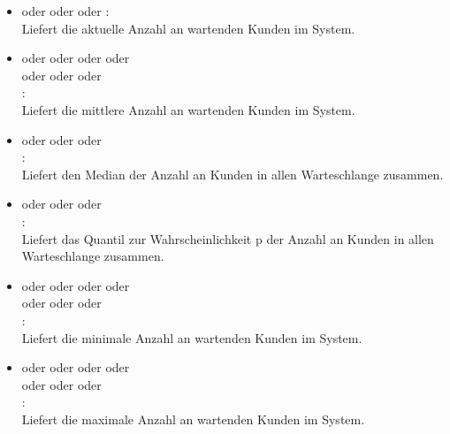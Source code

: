 \begin{itemize}    

\item
{} oder  oder  oder :\\
Liefert die aktuelle Anzahl an wartenden Kunden im System.

\item
{} oder  oder  oder  oder\\
 oder  oder  oder\\
:\\
Liefert die mittlere Anzahl an wartenden Kunden im System.

\item
{} oder  oder  oder\\
:\\
Liefert den Median der Anzahl an Kunden in allen Warteschlange zusammen.

\item
{} oder  oder  oder\\
:\\
Liefert das Quantil zur Wahrscheinlichkeit p der Anzahl an Kunden in allen Warteschlange zusammen.

\item
{} oder  oder  oder  oder\\
 oder  oder  oder\\
:\\
Liefert die minimale Anzahl an wartenden Kunden im System.

\item
{} oder  oder  oder  oder\\
 oder  oder  oder\\
:\\
Liefert die maximale Anzahl an wartenden Kunden im System.


\end{itemize}
